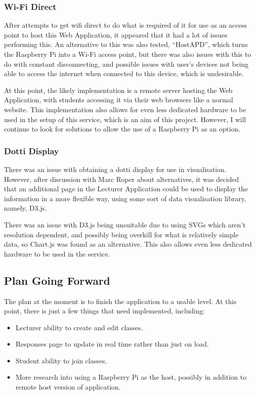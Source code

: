 \documentclass{article}
\begin{document}
\subsubsection {Wi-Fi Direct}
After attempts to get wifi direct to do what is required of it for use as an access point to host this Web Application, it appeared that it had a lot of issues performing this. An alternative to this was also tested, ``HostAPD'', which turns the Raspberry Pi into a Wi-Fi access point, but there was also issues with this to do with constant disconnecting, and possible issues with user's devices not being able to access the internet when connected to this device, which is undesirable.

At this point, the likely implementation is a remote server hosting the Web Application, with students accessing it via their web browsers like a normal website. This implementation also allows for even less dedicated hardware to be used in the setup of this service, which is an aim of this project. However, I will continue to look for solutions to allow the use of a Raspberry Pi as an option.

\subsubsection{Dotti Display}
There was an issue with obtaining a dotti display for use in visualisation. However, after discussion with Marc Roper about alternatives, it was decided that an additional page in the Lecturer Application could be used to display the information in a more flexible way, using some sort of data visualisation library, namely, D3.js. 

There was an issue with D3.js being unsuitable due to using SVGs which aren't resolution dependent, and possibly being overkill for what is relatively simple data, so Chart.js was found as an alternative. This also allows even less dedicated hardware to be used in the service.

\subsection{Plan Going Forward}
The plan at the moment is to finish the application to a usable level. At this point, there is just a few things that need implemented, including:
\begin{itemize}
  \item Lecturer ability to create and edit classes.
  \item Responses page to update in real time rather than just on load.
  \item Student ability to join classes.
  \item More research into using a Raspberry Pi as the host, possibly in addition to remote host version of application.
\end{itemize}
\end{document}

